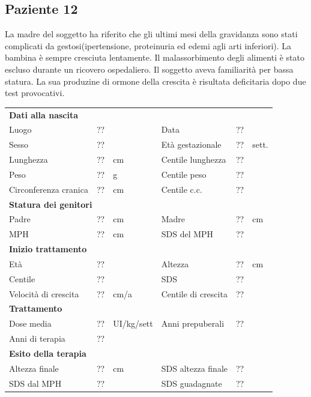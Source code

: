 \subsection*{Paziente 12}%

La madre del soggetto ha riferito che gli ultimi mesi della gravidanza sono stati complicati da gestosi(ipertensione, proteinuria ed edemi agli arti inferiori). La bambina è sempre cresciuta lentamente. Il malassorbimento degli alimenti è stato escluso durante un ricovero ospedaliero. Il soggetto aveva familiarità per bassa statura. La sua produzine di ormone della crescita è risultata deficitaria dopo due test provocativi. 

\begin{table}[!h]
\begin{tabular}{lrllrl}
\toprule
\multicolumn{6}{l}{\textbf{Dati alla nascita}}\\
Luogo 		& \multicolumn{2}{l}{??} 	& Data 					& \multicolumn{2}{l}{??} 	\\
Sesso 		& \multicolumn{2}{l}{??} 	& Età gestazionale 		& ?? 		& sett.\\
Lunghezza 	& ?? 		& cm 				& Centile lunghezza		& ?? 		\\
Peso 		& ?? 		& g					& Centile peso			& ?? 		\\
Circonferenza cranica	& ?? 		& cm 	& Centile c.c.			& ?? \\
\midrule
\multicolumn{6}{l}{\textbf{Statura dei genitori}}\\
Padre 		& ?? & cm 	& Madre 				& ?? & cm \\
MPH 		& ?? & cm 	& SDS del MPH 			& ??\\
\midrule
\multicolumn{6}{l}{\textbf{Inizio trattamento}} \\
Età	& ?? & 		& Altezza 				& ?? & cm  \\
Centile & ?? 	 &		& SDS		& ?? \\
Velocità di crescita & ?? & cm/a	& Centile di crescita & ??\\
\midrule
\multicolumn{6}{l}{\textbf{Trattamento}} \\
Dose media		& ?? & UI/kg/sett & Anni prepuberali & ??\\
Anni di terapia & ??\\
\midrule
\multicolumn{6}{l}{\textbf{Esito della terapia}} \\
Altezza finale			& ?? & cm 	& SDS altezza finale		& ??\\
SDS dal MPH				& ?? &		& SDS guadagnate 			& ??\\
\bottomrule
\end{tabular}
\end{table}
\clearpage



